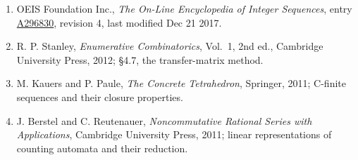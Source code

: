 \documentclass[11pt]{article}
\theoremstyle{definition}
\begin{document}
\begin{enumerate}

\item OEIS Foundation Inc., \emph{The On-Line Encyclopedia of Integer Sequences}, entry \href{https://oeis.org/A296830}{A296830}, revision 4, last modified Dec 21 2017.

\item R. P. Stanley, \emph{Enumerative Combinatorics}, Vol.~1, 2nd ed., Cambridge University Press, 2012; \S4.7, the transfer-matrix method.

\item M. Kauers and P. Paule, \emph{The Concrete Tetrahedron}, Springer, 2011; C-finite sequences and their closure properties.

\item J. Berstel and C. Reutenauer, \emph{Noncommutative Rational Series with Applications}, Cambridge University Press, 2011; linear representations of counting automata and their reduction.

\end{enumerate}
\end{document}
